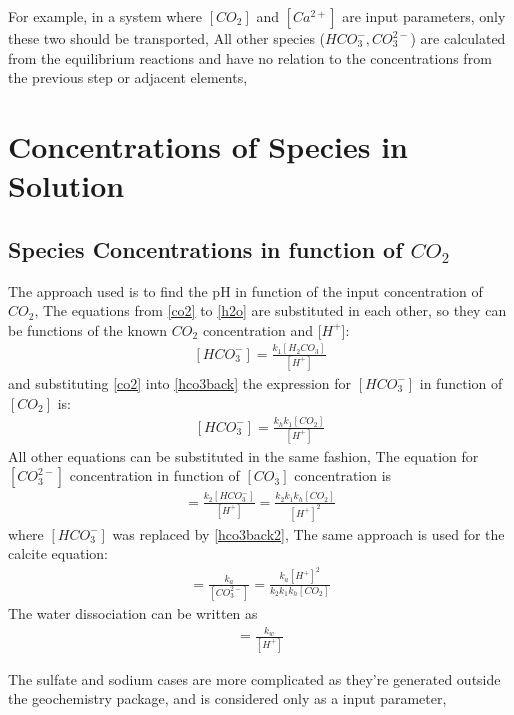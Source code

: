 \documentclass[11pt,a4paper,twoside]{report}
\begin{document}
For example, in a system where $[CO_{2}]$ and $[Ca^{2+}]$ are input parameters, only these two should be transported, All other species ($HCO_{3}^{-}, CO_{3}^{2-}$) are calculated from the equilibrium reactions and have no relation to the concentrations from the previous step or adjacent elements, 






\chapter{Concentrations of Species in Solution}\label{speciesinsol}
\section{Species Concentrations in function of \texorpdfstring{$CO_{2}$}{CO2}}\label{speconc}
The approach used is to find the pH in function of the input concentration of $CO_{2}$, The equations from \eqref{co2} to \eqref{h2o} are substituted in each other, so they can be functions of the known $CO_{2}$ concentration and $[H^{+}$]:
\begin{align}\label{hco3back}
[HCO_{3}^{-}] = \frac{k_{1}[H_{2}CO_{3}]}{[H^{+}]}
\end{align}
and substituting \eqref{co2} into \eqref{hco3back} the expression for $[HCO_{3}^{-}]$ in function of $[CO_{2}]$ is:
\begin{align}\label{hco3back2}
[HCO_{3}^{-}] = \frac{k_{h}k_{1}[CO_{2}]}{[H^{+}]}
\end{align}
All other equations can be substituted in the same fashion, The equation for $[CO_{3}^{2-}]$ concentration in function of $[CO_{3}]$ concentration is 
\begin{align}
[CO_{3}^{2-}] = \frac{k_{2}[HCO_{3}^{-}]}{[H^{+}]} = \frac{k_{2}k_{1}k_{h}[CO_{2}]}{[H^{+}]^{2}}
\end{align}
where $[HCO_{3}^{-}]$ was replaced by \eqref{hco3back2}, The same approach is used for the calcite equation:
\begin{align}
[Ca^{2+}] = \frac{k_{a}}{[CO_{3}^{2-}]} = \frac{k_{a}[H^{+}]^{2}}{k_{2}k_{1}k_{h}[CO_{2}]}
\end{align}
The water dissociation can be written as 
\begin{align}
[OH^{-}] = \frac{k_{w}}{[H^{+}]}
\end{align}

The sulfate and sodium cases are more complicated as they're generated outside the geochemistry package, and is considered only as a input parameter,
\end{document}
